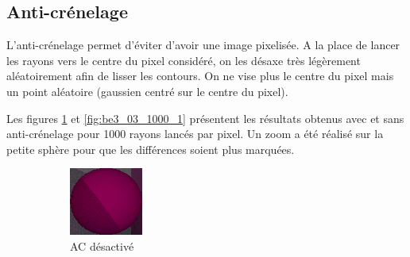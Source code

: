 \documentclass[12pt,a4paper,twoside]{report}
\begin{document}
\subsection{Anti-crénelage}

L'anti-crénelage permet d'éviter d'avoir une image pixelisée. A la place de lancer les rayons vers le centre du pixel considéré, on les désaxe très légèrement aléatoirement afin de lisser les contours. On ne vise plus le centre du pixel mais un point aléatoire (gaussien centré sur le centre du pixel).

Les figures \ref{fig:be3_02_1000_1} et \ref{fig:be3_03_1000_1} présentent les résultats obtenus avec et sans anti-crénelage pour 1000 rayons lancés par pixel. Un zoom a été réalisé sur la petite sphère pour que les différences soient plus marquées.

\begin{figure}[H]
	\centering
	\begin{subfigure}{.45\textwidth}
		\centering
		\includegraphics[width=1.\linewidth]{be3_02_1000_1}
		\caption{AC désactivé}
		\label{fig:be3_02_1000_1}
	\end{subfigure}
	\begin{subfigure}{.45\textwidth}
		\centering

\end{subfigure}
\end{figure}
\end{document}
